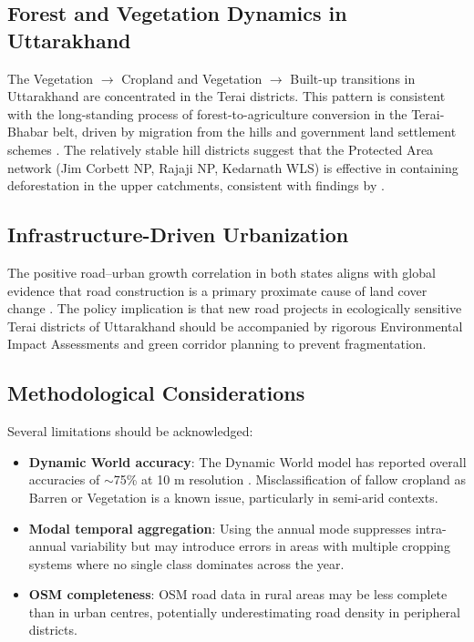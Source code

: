 \documentclass[12pt,a4paper]{article}
\begin{document}
\subsection{Forest and Vegetation Dynamics in Uttarakhand}
The Vegetation $\to$ Cropland and Vegetation $\to$ Built-up transitions in Uttarakhand are concentrated in the Terai districts. This pattern is consistent with the long-standing process of forest-to-agriculture conversion in the Terai-Bhabar belt, driven by migration from the hills and government land settlement schemes \citep{singh2017deforestation}. The relatively stable hill districts suggest that the Protected Area network (Jim Corbett NP, Rajaji NP, Kedarnath WLS) is effective in containing deforestation in the upper catchments, consistent with findings by \citet{joshi2021protected}.

\subsection{Infrastructure-Driven Urbanization}
The positive road--urban growth correlation in both states aligns with global evidence that road construction is a primary proximate cause of land cover change \citep{laurance2014}. The policy implication is that new road projects in ecologically sensitive Terai districts of Uttarakhand should be accompanied by rigorous Environmental Impact Assessments and green corridor planning to prevent fragmentation.

\subsection{Methodological Considerations}
Several limitations should be acknowledged:
\begin{itemize}
    \item \textbf{Dynamic World accuracy}: The Dynamic World model has reported overall accuracies of $\sim$75\% at 10 m resolution \citep{brown2022dynamic}. Misclassification of fallow cropland as Barren or Vegetation is a known issue, particularly in semi-arid contexts.
    \item \textbf{Modal temporal aggregation}: Using the annual mode suppresses intra-annual variability but may introduce errors in areas with multiple cropping systems where no single class dominates across the year.
    \item \textbf{OSM completeness}: OSM road data in rural areas may be less complete than in urban centres, potentially underestimating road density in peripheral districts.
\end{itemize}
\end{document}
